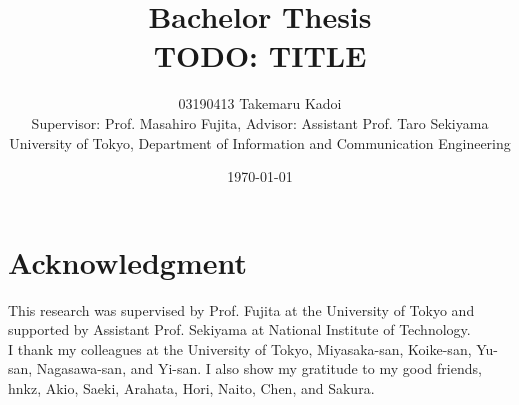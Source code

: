 \documentclass[12pt, a4paper, titlepage]{report}
\title{Bachelor Thesis \\ TODO: TITLE}
\author{
  03190413 Takemaru Kadoi
  \\[1cm]
  {\small Supervisor: Prof. Masahiro Fujita},
  {\small Advisor: Assistant Prof. Taro Sekiyama}
  \\[1cm]
  {\small University of Tokyo, Department of Information and Communication Engineering}
}
\date{\today}
\begin{document}


\maketitle
\newpage
\tableofcontents
\newpage

\chapter*{Acknowledgment}
This research was supervised by Prof. Fujita at the University of Tokyo and supported by Assistant Prof. Sekiyama at National Institute of Technology. \\
I thank my colleagues at the University of Tokyo, Miyasaka-san, Koike-san, Yu-san, Nagasawa-san, and Yi-san.
I also show my gratitude to my good friends, hnkz, Akio, Saeki, Arahata, Hori, Naito, Chen, and Sakura.

\end{document}
